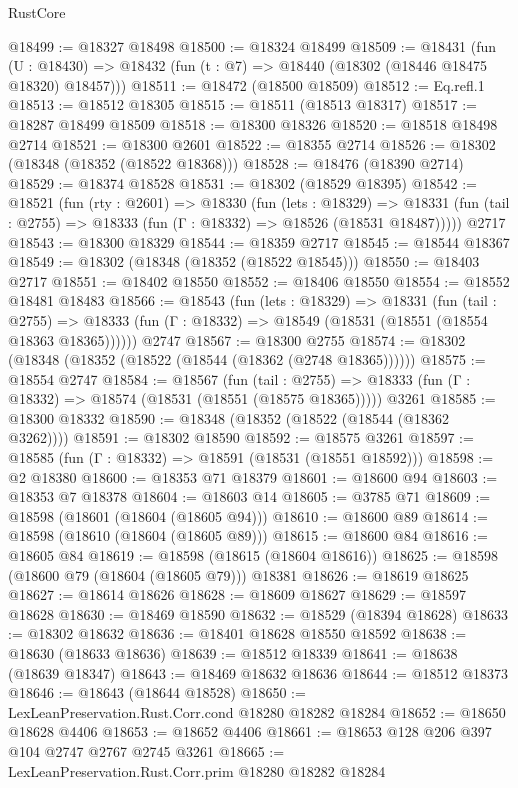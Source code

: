 \begin{lexlean}{RustCore}
\begin{coremodule}
@18499 := @18327 @18498
@18500 := @18324 @18499
@18509 := @18431
    (fun (U : @18430) => @18432 (fun (t : @7) => @18440 (@18302 (@18446 @18475 @18320) @18457)))
@18511 := @18472 (@18500 @18509)
@18512 := Eq.refl.{1}
@18513 := @18512 @18305
@18515 := @18511 (@18513 @18317)
@18517 := @18287 @18499 @18509
@18518 := @18300 @18326
@18520 := @18518 @18498 @2714
@18521 := @18300 @2601
@18522 := @18355 @2714
@18526 := @18302 (@18348 (@18352 (@18522 @18368)))
@18528 := @18476 (@18390 @2714)
@18529 := @18374 @18528
@18531 := @18302 (@18529 @18395)
@18542 := @18521
    (fun (rty : @2601) =>
    @18330
      (fun (lets : @18329) =>
      @18331 (fun (tail : @2755) => @18333 (fun (Γ : @18332) => @18526 (@18531 @18487)))))
    @2717
@18543 := @18300 @18329
@18544 := @18359 @2717
@18545 := @18544 @18367
@18549 := @18302 (@18348 (@18352 (@18522 @18545)))
@18550 := @18403 @2717
@18551 := @18402 @18550
@18552 := @18406 @18550
@18554 := @18552 @18481 @18483
@18566 := @18543
    (fun (lets : @18329) =>
    @18331
      (fun (tail : @2755) =>
      @18333 (fun (Γ : @18332) => @18549 (@18531 (@18551 (@18554 @18363 @18365))))))
    @2747
@18567 := @18300 @2755
@18574 := @18302 (@18348 (@18352 (@18522 (@18544 (@18362 (@2748 @18365))))))
@18575 := @18554 @2747
@18584 := @18567
    (fun (tail : @2755) => @18333 (fun (Γ : @18332) => @18574 (@18531 (@18551 (@18575 @18365)))))
    @3261
@18585 := @18300 @18332
@18590 := @18348 (@18352 (@18522 (@18544 (@18362 @3262))))
@18591 := @18302 @18590
@18592 := @18575 @3261
@18597 := @18585 (fun (Γ : @18332) => @18591 (@18531 (@18551 @18592)))
@18598 := @2 @18380
@18600 := @18353 @71 @18379
@18601 := @18600 @94
@18603 := @18353 @7 @18378
@18604 := @18603 @14
@18605 := @3785 @71
@18609 := @18598 (@18601 (@18604 (@18605 @94)))
@18610 := @18600 @89
@18614 := @18598 (@18610 (@18604 (@18605 @89)))
@18615 := @18600 @84
@18616 := @18605 @84
@18619 := @18598 (@18615 (@18604 @18616))
@18625 := @18598 (@18600 @79 (@18604 (@18605 @79))) @18381
@18626 := @18619 @18625
@18627 := @18614 @18626
@18628 := @18609 @18627
@18629 := @18597 @18628
@18630 := @18469 @18590
@18632 := @18529 (@18394 @18628)
@18633 := @18302 @18632
@18636 := @18401 @18628 @18550 @18592
@18638 := @18630 (@18633 @18636)
@18639 := @18512 @18339
@18641 := @18638 (@18639 @18347)
@18643 := @18469 @18632 @18636
@18644 := @18512 @18373
@18646 := @18643 (@18644 @18528)
@18650 := LexLeanPreservation.Rust.Corr.cond @18280 @18282 @18284
@18652 := @18650 @18628 @4406
@18653 := @18652 @4406
@18661 := @18653 @128 @206 @397 @104 @2747 @2767 @2745 @3261
@18665 := LexLeanPreservation.Rust.Corr.prim @18280 @18282 @18284

\end{coremodule}
\end{lexlean}
